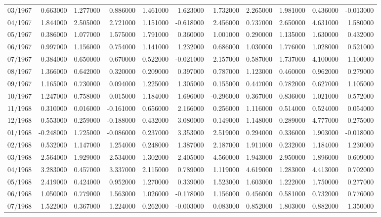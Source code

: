 \begin{tabular}{lrrrrrrrrrr}
03/1967 & 0.663000 & 1.277000 & 0.886000 & 1.461000 & 1.623000 & 1.732000 & 2.265000 & 1.981000 & 0.436000 & -0.013000 \\
04/1967 & 1.844000 & 2.505000 & 2.721000 & 1.151000 & -0.618000 & 2.456000 & 0.737000 & 2.650000 & 4.631000 & 1.580000 \\
05/1967 & 0.386000 & 1.077000 & 1.575000 & 1.791000 & 0.360000 & 1.001000 & 0.290000 & 1.135000 & 1.630000 & 0.432000 \\
06/1967 & 0.997000 & 1.156000 & 0.754000 & 1.141000 & 1.232000 & 0.686000 & 1.030000 & 1.776000 & 1.028000 & 0.521000 \\
07/1967 & 0.384000 & 0.650000 & 0.670000 & 0.522000 & -0.021000 & 2.157000 & 0.587000 & 1.737000 & 4.100000 & 1.100000 \\
08/1967 & 1.366000 & 0.642000 & 0.320000 & 0.209000 & 0.397000 & 0.787000 & 1.123000 & 0.460000 & 0.962000 & 0.279000 \\
09/1967 & 1.165000 & 0.730000 & 0.094000 & 1.225000 & 1.305000 & 0.155000 & 0.447000 & 0.782000 & 0.627000 & 1.105000 \\
10/1967 & 1.247000 & 0.758000 & 0.015000 & 1.184000 & 1.696000 & -0.296000 & 0.367000 & 0.836000 & 1.021000 & 0.572000 \\
11/1968 & 0.310000 & 0.016000 & -0.161000 & 0.656000 & 2.166000 & 0.256000 & 1.116000 & 0.514000 & 0.524000 & 0.054000 \\
12/1968 & 0.553000 & 0.259000 & -0.188000 & 0.432000 & 3.080000 & 0.149000 & 1.148000 & 0.289000 & 4.777000 & 0.275000 \\
01/1968 & -0.248000 & 1.725000 & -0.086000 & 0.237000 & 3.353000 & 2.519000 & 0.294000 & 0.336000 & 1.903000 & -0.018000 \\
02/1968 & 0.532000 & 1.147000 & 1.254000 & 0.248000 & 1.387000 & 2.187000 & 1.911000 & 0.232000 & 1.184000 & 1.230000 \\
03/1968 & 2.564000 & 1.929000 & 2.534000 & 1.302000 & 2.405000 & 4.560000 & 1.943000 & 2.950000 & 1.896000 & 0.609000 \\
04/1968 & 3.283000 & 0.457000 & 3.337000 & 2.115000 & 0.789000 & 1.119000 & 4.619000 & 1.283000 & 4.413000 & 0.702000 \\
05/1968 & 2.419000 & 0.424000 & 0.952000 & 1.270000 & 0.339000 & 1.523000 & 1.603000 & 1.222000 & 1.750000 & 0.277000 \\
06/1968 & 1.050000 & 0.779000 & 1.563000 & 1.026000 & -0.178000 & 1.156000 & 0.456000 & 0.581000 & 0.732000 & 0.776000 \\
07/1968 & 1.522000 & 0.367000 & 1.224000 & 0.262000 & -0.003000 & 0.083000 & 0.852000 & 1.803000 & 0.882000 & 1.350000 \\

\end{tabular}
